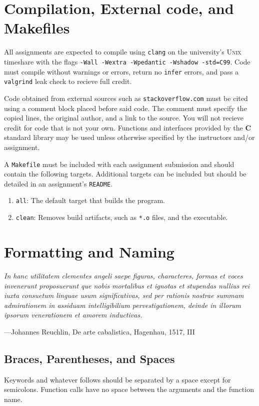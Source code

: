 \documentclass[11pt]{article}
\begin{document}

\section{Compilation, External code, and Makefiles}

All assignments are expected to compile using \texttt{clang} on
the university's \textsc{Unix} timeshare with the flags \texttt{-Wall -Wextra -Wpedantic -Wshadow -std=C99}.
Code must compile without warnings or errors, return no \texttt{infer} errors,
and pass a \texttt{valgrind} leak check to recieve full credit.

Code obtained from external sources such as \texttt{stackoverflow.com} must be
cited using a comment block placed before said code. The comment must specify
the copied lines, the original author, and a link to the source. You will not recieve credit for code that is
not your own. Functions and interfaces provided by the \textbf{C}
standard library may be used unless otherwise specified by the instructors
and/or assignment.

A \texttt{Makefile} must be included with each assignment submission and should contain the following targets.
Additional targets can be included but should be detailed in an assignment's \texttt{README}.
\begin{enumerate}
\item \texttt{all}: The default target that builds the program.
\item \texttt{clean}: Removes build artifacts, such as \texttt{*.o} files, and the executable.
\end{enumerate}



\section{Formatting and Naming}
\textwidth
\epigraph{\emph{
In hanc utilitatem clementes angeli saepe figuras, characteres, formas et voces invenerunt proposuerunt que nobis mortalibus et ignotas et stupendas nullius rei iuxta consuetum linguae usum significativas, sed per rationis nostrae summam admirationem in assiduam intelligibilium pervestigationem, deinde in illorum ipsorum venerationem et amorem inductivas.}}{---Johannes Reuchlin, De arte cabalistica, Hagenhau, 1517, III}

\subsection{Braces, Parentheses, and Spaces}
Keywords and whatever follows should be separated by a space except for
semicolons. Function calls have no space between
the arguments and the function name.
\end{document}
